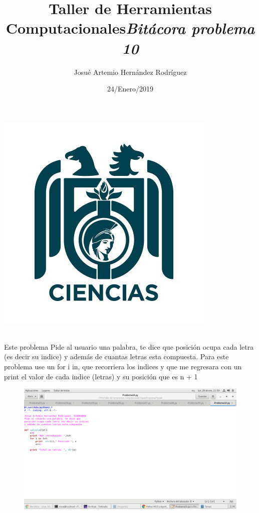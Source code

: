 \label{key}\documentclass[letterpaper, 12pt,oneside]{article}
\title{\Huge Taller de Herramientas Computacionales}
\author{Josué Artemio Hernández Rodríguez}
\date{24/Enero/2019}
\begin{document}
	\maketitle
	\begin{center}
		\includegraphics[scale=0.7]{3.jpg}
	\end{center}

	\newpage
	
	\title{\huge \textit{Bitácora problema 10 }}\\

	Este problema Pide al usuario una palabra, te dice que posición ocupa cada letra (es decir su indice) y además de cuantas letras esta compuesta. Para este problema use un for i in, que recorriera los indices y que me regresara con un print el valor de cada indice (letras) y su posición que es n + 1
	
	
	
	
	
	
	  
	 

	\begin{figure}[h]
		\includegraphics[scale=0.4]{pro10.png}
		
	\end{figure}

	
	
\end{document}
